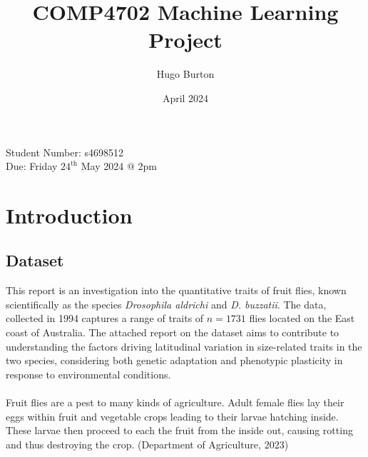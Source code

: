 \documentclass{article}
\title{COMP4702 Machine Learning Project}
\author{Hugo Burton}
\date{April 2024}
\begin{document}
\maketitle
\thispagestyle{fancy}

\newcommand{\PP}{\mathbb{P}}
\newcommand{\cc}{^{\mathsf{c}}}

\newcommand{\A}{\ensuremath{\mathbb{A}}}
\newcommand{\C}{\ensuremath{\mathbb{C}}}
\newcommand{\E}{\ensuremath{\mathbb{E}}}
\newcommand{\I}{\ensuremath{\mathbb{I}}}
\newcommand{\J}{\ensuremath{\mathbb{J}}}
\newcommand{\N}{\ensuremath{\mathbb{N}}}
\newcommand{\pr}{\ensuremath{\mathbb{P}}}
\newcommand{\Q}{\ensuremath{\mathbb{Q}}}
\newcommand{\R}{\ensuremath{\mathbb{R}}}
\newcommand{\T}{\ensuremath{\mathbb{T}}}
\newcommand{\X}{\ensuremath{\mathbb{X}}}

\newcommand{\qed}{\hfill\blacksquare}

\newcommand{\scriptG}{\mathcal{G}}
\newcommand{\scriptN}{\mathcal{N}}
\newcommand{\scriptI}{\mathcal{I}}
\newcommand{\scriptL}{\mathcal{L}}
\newcommand{\scriptR}{\mathcal{R}}

\newcommand{\var}{\text{Var}}

\newcommand{\bs}[1]{\boldsymbol{#1}} %
\newcommand{\dif}[1]{\text{d#1}}
\newcommand{\ddx}{\frac{\text{d}}{\dif{x}}}

\newcommand{\ito}{\ensuremath{\text{It}\hat{\text{o}}}}

\noindent
Student Number: s4698512\\
Due: Friday $24^{\text{th}}$ May 2024 @ 2pm

\section{Introduction}

\subsection{Dataset}

This report is an investigation into the quantitative traits of fruit flies, known scientifically as the species \textit{Drosophila aldrichi} and \textit{D. buzzatii}. The data, collected in 1994 captures a range of traits of $n = 1731$ flies located on the East coast of Australia. The attached report on the dataset aims to contribute to understanding the factors driving latitudinal variation in size-related traits in the two species, considering both genetic adaptation and phenotypic plasticity in response to environmental conditions. \\
\\
Fruit flies are a pest to many kinds of agriculture. Adult female flies lay their eggs within fruit and vegetable crops leading to their larvae hatching inside. These larvae then proceed to each the fruit from the inside out, causing rotting and thus destroying the crop. (Department of Agriculture, 2023)
\end{document}
